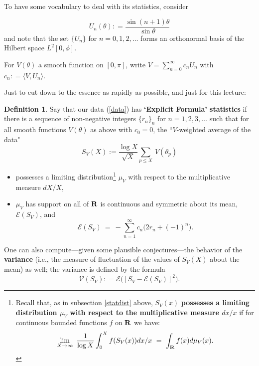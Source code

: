 \documentclass[11pt]{article}
\theoremstyle{plain}
\theoremstyle{definition}
\newtheorem{definition}[theorem]{Definition}
\numberwithin{equation}{section}
\numberwithin{figure}{section}
\numberwithin{table}{section}
\begin{document}
To have some vocabulary to deal with its statistics, consider

$$U_n(\theta) : = {\frac {\sin(n+1)\theta}{\sin\theta}}$$ and note that the set $\{U_n\}$ for $n=0,1,2,\dots$ forms an orthonormal basis of the Hilbert space $L^2[0,\phi]$.

For $V(\theta)$ a smooth function on $[0,\pi]$, write $V=\sum_{n=0}^{\infty} c_nU_n$ with $c_n: = \langle V, U_n\rangle$.

Just to cut down to the essence as rapidly as possible, and just for this lecture:

\begin{definition} Say that our data (\ref{data}) has {\bf `Explicit Formula' statistics} if there is a sequence of non-negative integers $\{r_n\}_n$  for $n=1,2,3, \dots$ such that for all smooth functions $V(\theta)$ as above with $c_0=0$, the ``$V$-weighted average of the data"
\begin{equation}
S_V(X):= {\frac{\log X}{\sqrt X}}\sum_{p \le X} \ V(\theta_p)
\end{equation}
\begin{itemize}
\item
possesses a limiting distribution{\footnote{ Recall that, as in subsection    \ref{statdist} above,  $S_V(x)$ {\bf possesses a limiting distribution $\mu_V$ with respect to the multiplicative measure $dx/x$} if for continuous bounded functions $f$ on ${\bf R}$ we have:
\begin{equation}
\lim_{X \to {\infty}}\ {\frac{1}{\log X}}\int_0^Xf(S_V(x))dx/x \ = \ \int_{\bf R}f(x)d\mu_V(x).
\end{equation}}}
 $\mu_V$ with respect to the multiplicative measure $dX/X$,
\item  $\mu_V$ has support on all of ${\bf R}$ is continuous and symmetric about its mean, ${\mathcal E}(S_V)$, and
\begin{equation}\label{eqnmean}
{\mathcal E}(S_V)\ = \ -\sum_{n=1}^{\infty}  c_n\big(2r_n+(-1)^n\big).
\end{equation}
\end{itemize}
\end{definition}

\bigskip
One can also compute---given some plausible conjectures---the behavior of the {\bf variance}  (i.e., the measure of fluctuation of the values of $S_V(X)$ about the mean) as well; the variance is defined by the formula  $${\mathcal V}(S_V): = {\mathcal E}\big([S_V  - {\mathcal E}(S_V)]^2\big).$$
\end{document}
